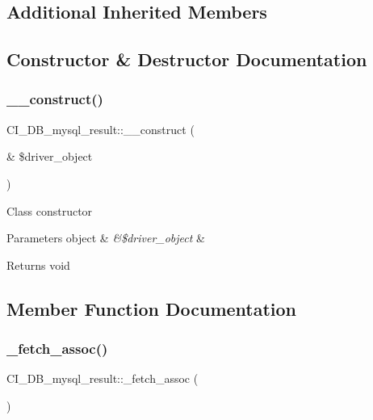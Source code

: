 \subsection*{Additional Inherited Members}


\subsection{Constructor \& Destructor Documentation}
\mbox{\label{class_c_i___d_b__mysql__result_af1aa078f9aefff4e64d27ae3d174a6a8}} 
\subsubsection{\texorpdfstring{\+\_\+\+\_\+construct()}{\_\_construct()}}
{\footnotesize\ttfamily C\+I\+\_\+\+D\+B\+\_\+mysql\+\_\+result\+::\+\_\+\+\_\+construct (\begin{DoxyParamCaption}\item[{\&}]{\$driver\+\_\+object }\end{DoxyParamCaption})}

Class constructor


\begin{DoxyParams}[1]{Parameters}
object & {\em \&\$driver\+\_\+object} & \\
\hline
\end{DoxyParams}
\begin{DoxyReturn}{Returns}
void 
\end{DoxyReturn}


\subsection{Member Function Documentation}
\mbox{\label{class_c_i___d_b__mysql__result_a006453d356bca95a5007278abcc92590}} 
\subsubsection{\texorpdfstring{\+\_\+fetch\+\_\+assoc()}{\_fetch\_assoc()}}
{\footnotesize\ttfamily C\+I\+\_\+\+D\+B\+\_\+mysql\+\_\+result\+::\+\_\+fetch\+\_\+assoc (\begin{DoxyParamCaption}{ }\end{DoxyParamCaption})\hspace{0.3cm}{\ttfamily [protected]}}

